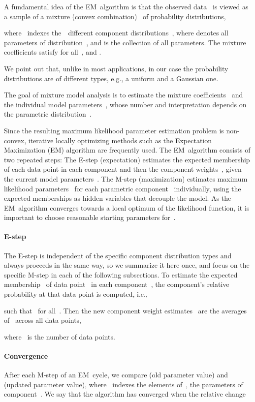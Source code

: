 \documentclass{article}
\begin{document}
A fundamental idea of the EM~algorithm is that the observed data~ is viewed as a sample of a mixture (convex combination)~ of probability distributions,

where ~indexes the~~different component distributions~, where  denotes all parameters of distribution~, and  is the collection of all parameters.
The mixture coefficients  satisfy  for all~, and .

We point out that, unlike in most applications, in our case the probability distributions  are of different types, e.g., a uniform and a Gaussian one.

The goal of mixture model analysis is to estimate the mixture coefficients~ and the individual model parameters~, whose number and interpretation depends on the parametric distribution~.

Since the resulting maximum likelihood parameter estimation problem is non-convex, iterative locally optimizing methods such as the Expectation Maximization (EM) algorithm are frequently used.
The EM~algorithm consists of two repeated steps:
The E-step (expectation) estimates the expected membership of each data point in each component and then the component weights~, given the current model parameters~.
The M-step (maximization) estimates maximum likelihood parameters~ for each parametric component~ individually, using the expected memberships as hidden variables that decouple the model.
As the EM~algorithm converges towards a local optimum of the likelihood function, it is important to choose reasonable starting parameters for~.

\paragraph{E-step}
The E-step is independent of the specific component distribution types and always proceeds in the same way, so we summarize it here once, and focus on the specific M-step in each of the following subsections.
To estimate the expected membership~ of data point~ in each component~, the component's relative probability at that data point is computed, i.e.,

such that~ for all~.
Then the new component weight estimates~ are the averages of~ across all data points,

where~ is the number of data points.

\paragraph{Convergence}
After each M-step of an EM~cycle, we compare  (old parameter value) and  (updated parameter value), where~ indexes the elements of~, the parameters of component~.
We say that the algorithm has converged when the relative change
\end{document}
